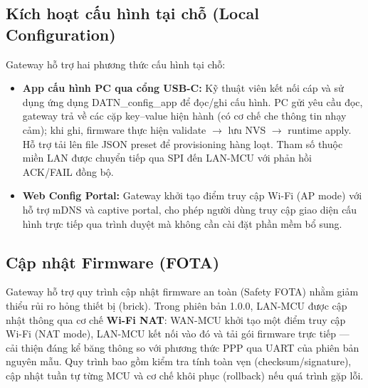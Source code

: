     \subsection{Kích hoạt cấu hình tại chỗ (Local Configuration)}

    Gateway hỗ trợ hai phương thức cấu hình tại chỗ:

    \begin{itemize}
        \item \textbf{App cấu hình PC qua cổng USB-C:} Kỹ thuật viên kết nối cáp và sử dụng ứng dụng DATN\_config\_app để đọc/ghi cấu hình. PC gửi yêu cầu đọc, gateway trả về các cặp key–value hiện hành (có cơ chế che thông tin nhạy cảm); khi ghi, firmware thực hiện validate $\to$ lưu NVS $\to$ runtime apply. Hỗ trợ tải lên file JSON preset để provisioning hàng loạt. Tham số thuộc miền LAN được chuyển tiếp qua SPI đến LAN-MCU với phản hồi ACK/FAIL đồng bộ.
        \item \textbf{Web Config Portal:} Gateway khởi tạo điểm truy cập Wi-Fi (AP mode) với hỗ trợ mDNS và captive portal, cho phép người dùng truy cập giao diện cấu hình trực tiếp qua trình duyệt mà không cần cài đặt phần mềm bổ sung.
    \end{itemize}

    \subsection{Cập nhật Firmware (FOTA)}

    Gateway hỗ trợ quy trình cập nhật firmware an toàn (Safety FOTA) nhằm giảm thiểu rủi ro hỏng thiết bị (brick). Trong phiên bản 1.0.0, LAN-MCU được cập nhật thông qua cơ chế \textbf{Wi-Fi NAT}: WAN-MCU khởi tạo một điểm truy cập Wi-Fi (NAT mode), LAN-MCU kết nối vào đó và tải gói firmware trực tiếp — cải thiện đáng kể băng thông so với phương thức PPP qua UART của phiên bản nguyên mẫu. Quy trình bao gồm kiểm tra tính toàn vẹn (checksum/signature), cập nhật tuần tự từng MCU và cơ chế khôi phục (rollback) nếu quá trình gặp lỗi.